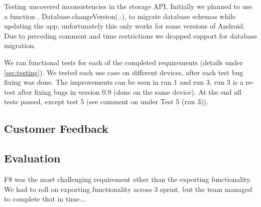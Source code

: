 Testing uncovered inconsistencies in the storage API. Initially we planned to
use a function , Database.changeVersion(..), to migrate database schemas while
updating the app, unfortunately this only works for some versions of Android.
Due to preceding comment and time restrictions we dropped support for database
migration.

We ran functional tests for each of the completed requirements (details under
\ref{sec:testing}). We tested each use case on different devices, after each test bug
fixing was done. The improvements can be seen in run 1 and run 3, run 3 is a
re-test after fixing bugs in version 0.9 (done on the same device). At the end
all tests passed, except test 5 (see comment on under Test 5 (run 3)).

\subsection{Customer Feedback}

\subsection{Evaluation}

F8 was the most challenging requirement other than the exporting functionality.
We had to roll on exporting functionality across 3 sprint, but the team managed
to complete that in time...

